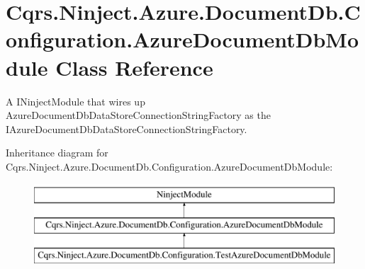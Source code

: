 \hypertarget{classCqrs_1_1Ninject_1_1Azure_1_1DocumentDb_1_1Configuration_1_1AzureDocumentDbModule}{}\section{Cqrs.\+Ninject.\+Azure.\+Document\+Db.\+Configuration.\+Azure\+Document\+Db\+Module Class Reference}
\label{classCqrs_1_1Ninject_1_1Azure_1_1DocumentDb_1_1Configuration_1_1AzureDocumentDbModule}


A I\+Ninject\+Module that wires up Azure\+Document\+Db\+Data\+Store\+Connection\+String\+Factory as the I\+Azure\+Document\+Db\+Data\+Store\+Connection\+String\+Factory.  


Inheritance diagram for Cqrs.\+Ninject.\+Azure.\+Document\+Db.\+Configuration.\+Azure\+Document\+Db\+Module\+:\begin{figure}[H]
\begin{center}
\leavevmode
\includegraphics[height=3.000000cm]{classCqrs_1_1Ninject_1_1Azure_1_1DocumentDb_1_1Configuration_1_1AzureDocumentDbModule}
\end{center}
\end{figure}
